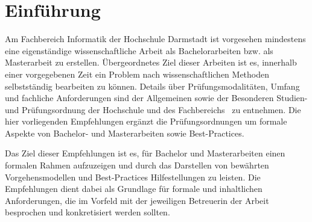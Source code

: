 \section{Einführung}\label{sec:einfuhrung}
%
Am Fachbereich Informatik der Hochschule Darmstadt ist vorgesehen mindestens eine eigenständige wissenschaftliche Arbeit als Bachelorarbeiten bzw. als Masterarbeit zu erstellen. Übergeordnetes Ziel dieser Arbeiten ist es, innerhalb einer vorgegebenen Zeit ein Problem nach wissenschaftlichen Methoden selbstständig bearbeiten zu können. Details über Prüfungsmodalitäten, Umfang und fachliche Anforderungen sind der Allgemeinen sowie der Besonderen Studien- und Prüfungsordnung der Hochschule und des Fachbereichs~\cite{hda:2012:01,fbi:2014:01} zu entnehmen. Die hier vorliegenden Empfehlungen ergänzt die Prüfungsordnungen um formale Aspekte von Bachelor- und Masterarbeiten sowie Best-Practices.

Das Ziel dieser Empfehlungen ist es, für Bachelor und Masterarbeiten einen formalen Rahmen aufzuzeigen und durch das Darstellen von bewährten Vorgehensmodellen und Best-Practices Hilfestellungen zu leisten. Die Empfehlungen dient dabei als Grundlage für formale und inhaltlichen Anforderungen, die im Vorfeld mit der jeweiligen Betreuerin der Arbeit besprochen und konkretisiert werden sollten.
